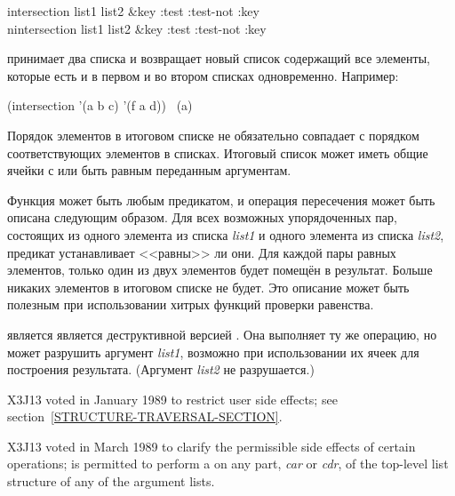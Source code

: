 \begin{defun}[Функция]
intersection list1 list2 &key :test :test-not :key \\
nintersection list1 list2 &key :test :test-not :key

 принимает два списка и возвращает новый список содержащий все
элементы, которые есть и в первом и во втором списках одновременно.
Например:
\begin{lisp}
(intersection '(a b c) '(f a d)) \EV\ (a)
\end{lisp}

Порядок элементов в итоговом списке не обязательно совпадает с порядком
соответствующих элементов в списках.
Итоговый список может иметь общие ячейки с или быть равным  переданным
аргументам.

Функция  может быть любым предикатом, и операция пересечения может
быть описана следующим образом. Для всех возможных упорядоченных пар, состоящих
из одного элемента из списка \emph{list1} и одного элемента из списка
\emph{list2}, предикат устанавливает <<равны>> ли они. Для каждой пары равных
элементов, только один из двух элементов будет помещён в результат. Больше
никаких элементов в итоговом списке не будет. Это описание может быть полезным
при использовании хитрых функций проверки равенства.

 является является деструктивной версией .
Она выполняет ту же операцию, но может разрушить аргумент \emph{list1}, возможно при
использовании их ячеек для построения результата. (Аргумент \emph{list2} не
разрушается.)

\begin{new}
X3J13 voted in January 1989
to restrict user side effects; see section~\ref{STRUCTURE-TRAVERSAL-SECTION}.
\end{new}

\begin{newer}
X3J13 voted in March 1989 
to clarify the permissible side effects of certain operations;
 is permitted to perform a  on any part,
\emph{car} or \emph{cdr}, of the top-level list structure of 
any of the argument lists.
\end{newer}
\end{defun}


